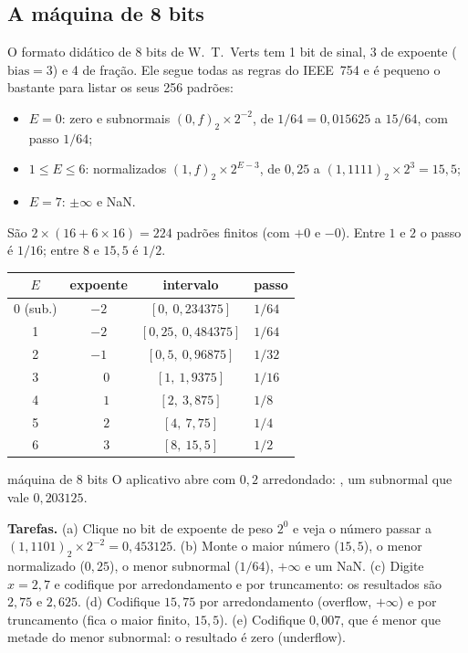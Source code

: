 \subsection{A máquina de 8 bits}

O formato didático de 8 bits de W.~T.~Verts tem 1 bit de sinal, 3 de expoente
($\text{bias}=3$) e 4 de fração. Ele segue todas as regras do IEEE~754 e é pequeno o bastante para
listar os seus 256 padrões:
\begin{itemize}[nosep]
  \item $E=0$: zero e subnormais $(0{,}f)_2\times2^{-2}$, de $1/64=0{,}015625$ a $15/64$, com passo $1/64$;
  \item $1\le E\le6$: normalizados $(1{,}f)_2\times2^{E-3}$, de $0{,}25$ a $(1{,}1111)_2\times2^3=15{,}5$;
  \item $E=7$: $\pm\infty$ e NaN.
\end{itemize}
São $2\times(16+6\times16)=224$ padrões finitos (com $+0$ e $-0$). Entre $1$ e $2$ o passo é $1/16$;
entre $8$ e $15{,}5$ é $1/2$.

\begin{center}
\small
\begin{tabular}{cccl}
\toprule
$E$ & expoente & intervalo & passo\\
\midrule
0 (sub.) & $-2$ & $[0,\ 0{,}234375]$ & $1/64$\\
1 & $-2$ & $[0{,}25,\ 0{,}484375]$ & $1/64$\\
2 & $-1$ & $[0{,}5,\ 0{,}96875]$ & $1/32$\\
3 & $\phantom{-}0$ & $[1,\ 1{,}9375]$ & $1/16$\\
4 & $\phantom{-}1$ & $[2,\ 3{,}875]$ & $1/8$\\
5 & $\phantom{-}2$ & $[4,\ 7{,}75]$ & $1/4$\\
6 & $\phantom{-}3$ & $[8,\ 15{,}5]$ & $1/2$\\
\bottomrule
\end{tabular}
\end{center}

\begin{atividade}{máquina de 8 bits}{\arqMoito}
O aplicativo abre com $0{,}2$ arredondado: , um subnormal que vale $0{,}203125$.

\textbf{Tarefas.} (a) Clique no bit de expoente de peso $2^0$ e veja o número passar a
$(1{,}1101)_2\times2^{-2}=0{,}453125$. (b) Monte o maior número ($15{,}5$), o menor normalizado ($0{,}25$),
o menor subnormal ($1/64$), $+\infty$ e um NaN. (c) Digite $x=2{,}7$ e codifique por arredondamento e por
truncamento: os resultados são $2{,}75$ e $2{,}625$. (d) Codifique $15{,}75$ por arredondamento (overflow,
$+\infty$) e por truncamento (fica o maior finito, $15{,}5$). (e) Codifique $0{,}007$, que é menor que
metade do menor subnormal: o resultado é zero (underflow).
\end{atividade}



